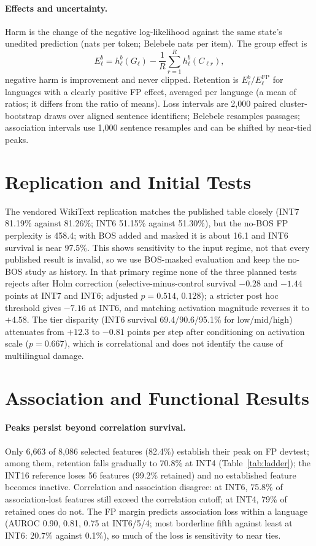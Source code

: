 \paragraph{Effects and uncertainty.}
Harm is the change of the negative log-likelihood against the same state's unedited prediction (nats per token; Belebele nats per item). The group effect is
\begin{equation}
 E_\ell^b=h_\ell^b(G_\ell)-\frac{1}{R}\sum_{r=1}^{R}h_\ell^b(C_{\ell r}),
 \label{eq:effect}
\end{equation}
negative harm is improvement and never clipped. Retention is $E_\ell^b/E_\ell^{\mathrm{FP}}$ for languages with a clearly positive FP effect, averaged per language (a mean of ratios; it differs from the ratio of means). Loss intervals are 2,000 paired cluster-bootstrap draws over aligned sentence identifiers; Belebele resamples passages; association intervals use 1,000 sentence resamples and can be shifted by near-tied peaks.

\section{Replication and Initial Tests}
The vendored WikiText replication matches the published table closely (INT7 81.19\% against 81.26\%; INT6 51.15\% against 51.30\%), but the no-BOS FP perplexity is 458.4; with BOS added and masked it is about 16.1 and INT6 survival is near 97.5\%. This shows sensitivity to the input regime, not that every published result is invalid, so we use BOS-masked evaluation and keep the no-BOS study as history. In that primary regime none of the three planned tests rejects after Holm correction (selective-minus-control survival $-0.28$ and $-1.44$ points at INT7 and INT6; adjusted $p=0.514$, $0.128$); a stricter post hoc threshold gives $-7.16$ at INT6, and matching activation magnitude reverses it to $+4.58$. The tier disparity (INT6 survival 69.4/90.6/95.1\% for low/mid/high) attenuates from $+12.3$ to $-0.81$ points per step after conditioning on activation scale ($p=0.667$), which is correlational and does not identify the cause of multilingual damage.

\section{Association and Functional Results}
\paragraph{Peaks persist beyond correlation survival.}
Only 6,663 of 8,086 selected features (82.4\%) establish their peak on FP devtest; among them, retention falls gradually to 70.8\% at INT4 (Table~\ref{tab:ladder}); the INT16 reference loses 56 features (99.2\% retained) and no established feature becomes inactive. Correlation and association disagree: at INT6, 75.8\% of association-lost features still exceed the correlation cutoff; at INT4, 79\% of retained ones do not. The FP margin predicts association loss within a language (AUROC 0.90, 0.81, 0.75 at INT6/5/4; most borderline fifth against least at INT6: 20.7\% against 0.1\%), so much of the loss is sensitivity to near ties.

